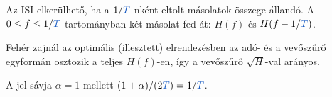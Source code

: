 Az ISI elkerülhető, ha a $1/{\ca{T}}$-nként eltolt másolatok összege állandó. A $0\le f\le1/{\ca{T}}$ tartományban két másolat fed át: $H(f)$ és $H(f-1/{\ca{T}})$.

\begin{center}\end{center}

\begin{center}\end{center}

Fehér zajnál az optimális (illesztett) elrendezésben az adó- és a vevőszűrő egyformán osztozik a teljes $H(f)$-en, így a vevőszűrő $\sqrt{H}$-val arányos.

\begin{center}\end{center}

A jel sávja $\alpha=1$ mellett $(1+\alpha)/(2{\ca{T}})=1/{\ca{T}}$.

\begin{center}\end{center}

\begin{center}\end{center}

